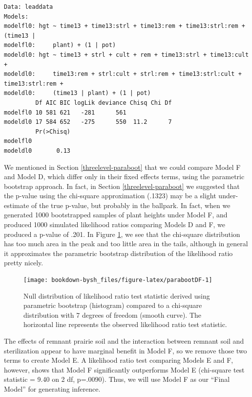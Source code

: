 \documentclass[
]{krantz}
\begin{document}
\begin{verbatim}
Data: leaddata
Models:
modelfl0: hgt ~ time13 + time13:strl + time13:rem + time13:strl:rem + (time13 | 
modelfl0:     plant) + (1 | pot)
modeldl0: hgt ~ time13 + strl + cult + rem + time13:strl + time13:cult + 
modeldl0:     time13:rem + strl:cult + strl:rem + time13:strl:cult + time13:strl:rem + 
modeldl0:     (time13 | plant) + (1 | pot)
         Df AIC BIC logLik deviance Chisq Chi Df
modelfl0 10 581 621   -281      561             
modeldl0 17 584 652   -275      550  11.2      7
         Pr(>Chisq)
modelfl0           
modeldl0       0.13
\end{verbatim}

We mentioned in Section \ref{threelevel-paraboot} that we could compare Model F and Model D, which differ only in their fixed effects terms, using the parametric bootstrap approach. In fact, in Section \ref{threelevel-paraboot} we suggested that the p-value using the chi-square approximation (.1323) may be a slight under-estimate of the true p-value, but probably in the ballpark. In fact, when we generated 1000 bootstrapped samples of plant heights under Model F, and produced 1000 simulated likelihood ratios comparing Models D and F, we produced a p-value of .201. In Figure \ref{fig:parabootDF}, we see that the chi-square distribution has too much area in the peak and too little area in the tails, although in general it approximates the parametric bootstrap distribution of the likelihood ratio pretty nicely.

\begin{figure}

{\centering \texttt{[image: bookdown-bysh\_files/figure-latex/parabootDF-1]} 

}

\caption{Null distribution of likelihood ratio test statistic derived using parametric bootstrap (histogram) compared to a chi-square distribution with 7 degrees of freedom (smooth curve).  The horizontal line represents the observed likelihood ratio test statistic.}\label{fig:parabootDF}
\end{figure}

The effects of remnant prairie soil and the interaction between remnant soil and sterilization appear to have marginal benefit in Model F, so we remove those two terms to create Model E. A likelihood ratio test comparing Models E and F, however, shows that Model F significantly outperforms Model E (chi-square test statistic = 9.40 on 2 df, p=.0090). Thus, we will use Model F as our ``Final Model'' for generating inference.
\end{document}
